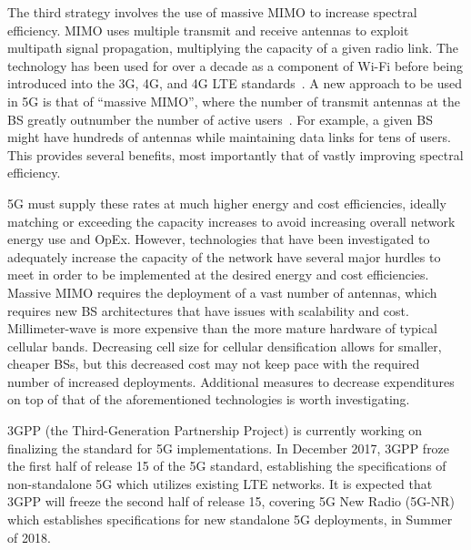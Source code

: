 \documentclass[12pt,dvipsnames]{report}
\begin{document}

The third strategy involves the use of massive MIMO to increase spectral efficiency.  MIMO uses multiple transmit and receive antennas to exploit multipath signal propagation, multiplying the capacity of a given radio link.  The technology has been used for over a decade as a component of Wi-Fi before being introduced into the 3G, 4G, and 4G LTE standards~\cite{6824752}.  A new approach to be used in 5G is that of ``massive MIMO'', where the number of transmit antennas at the BS greatly outnumber the number of active users~\cite{5595728}.  For example, a given BS might have hundreds of antennas while maintaining data links for tens of users.  This provides several benefits, most importantly that of vastly improving spectral efficiency.

5G must supply these rates at much higher energy and cost efficiencies, ideally matching or exceeding the capacity increases to avoid increasing overall network energy use and OpEx.  However, technologies that have been investigated to adequately increase the capacity of the network have several major hurdles to meet in order to be implemented at the desired energy and cost efficiencies.  Massive MIMO requires the deployment of a vast number of antennas, which requires new BS architectures that have issues with scalability and cost.  Millimeter-wave is more expensive than the more mature hardware of typical cellular bands.  Decreasing cell size for cellular densification allows for smaller, cheaper BSs, but this decreased cost may not keep pace with the required number of increased deployments.  Additional measures to decrease expenditures on top of that of the aforementioned technologies is worth investigating.~\cite{6824752}

3GPP (the Third-Generation Partnership Project) is currently working on finalizing the standard for 5G implementations.  In December 2017, 3GPP froze the first half of release 15 of the 5G standard, establishing the specifications of non-standalone 5G which utilizes existing LTE networks.  It is expected that 3GPP will freeze the second half of release 15, covering 5G New Radio (5G-NR) which establishes specifications for new standalone 5G deployments, in Summer of 2018.
\end{document}
